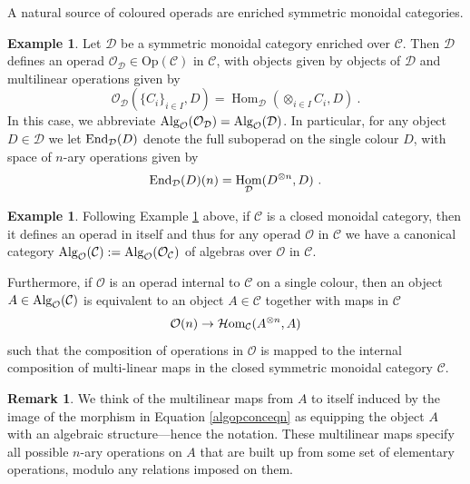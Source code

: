 \documentclass[11pt]{amsart}
\numberwithin{equation}{section}
\theoremstyle{definition}
\newtheorem{eg}[theo]{Example}
\newtheorem{rmk}[theo]{Remark}
\newcommand{\bb}{\mathbb}
\newcommand{\mc}{\mathcal}
\newcommand{\cEnd}{{\textup{End}}}
\newcommand{\D}{{\mathcal{D}}}
\DeclareMathOperator{\Hom}{Hom}
\DeclareMathOperator{\Vect}{Vect}
\newcommand{\Mod}{{\textup{-Mod}}}
\newcommand{\K}{{\bb K}}
\newcommand{\Alg}{{\textup{Alg}}}
\newcommand{\Homi}{{\mc H\textup{om}}}
\newcommand{\Op}{{\textup{Op}}}
\newcommand{\0}{{\textbf{0}}}
\def \Op{\mathrm{Op}}
\begin{document}
A natural source of coloured operads are enriched symmetric monoidal categories.
\begin{eg}\label{symmonoidcatopeg} Let $\D$ be a symmetric monoidal category enriched over $\mc C$. Then $\D$ defines an operad $\mc O_{\D}\in \Op(\mc C)$ in $\mc C$, with objects given by objects of $\D$ and multilinear operations given by
	$$ \mc O_{\D} (\{C_i\}_{i\in I},D) =\Hom_{\D}(\otimes_{i\in I} C_i,D) \ .$$
	In this case, we abbreviate $\Alg_{\mc O}(\mc O_{\D})=\Alg_{\mc O}(\D)$. In particular, for any object $D \in \mc D$ we let $\cEnd_{\mc D}(D)$ denote the full suboperad on the single colour $D$, with space of $n$-ary operations given by
	\[ \cEnd_{\mc D}(D)(n) = \Hom_{\mc D} (D^{\otimes n}, D)\ .   \]
\end{eg}




\begin{eg}Following Example \ref{symmonoidcatopeg} above, if $\mc C$ is a closed monoidal category, then it defines an operad in itself and thus for any operad $\mc O$ in $\mc C$ we have a canonical category $\Alg_{\mc O}(\mc C):=\Alg_{\mc O}(\mc O_{\mc C})$ of algebras over $\mc O$ in $\mc C$.
	
	Furthermore, if $\mc O$ is an operad internal to $\mc C$ on a single colour, then an object $A\in \Alg_{\mc O}(\mc C)$ is equivalent to an object $A \in \mc C$ together with maps in $\mc C$
\begin{equation}\label{algopconceqn}
		 \mc O(n) \to \Homi_{\mc C}( A^{\otimes n} , A)  
\end{equation}
	such that the composition of operations in $\mc O$ is mapped to the internal composition of multi-linear maps in the closed symmetric monoidal category $\mc C$.
\end{eg}



\begin{rmk}
	We think of the multilinear maps from $A$ to itself induced by the image of the morphism in Equation \ref{algopconceqn} as equipping the object $A$ with an algebraic structure---hence the notation.
	These multilinear maps specify all possible $n$-ary operations on $A$ that are built up from some set of elementary operations, modulo any relations imposed on them.
\end{rmk}
\end{document}
